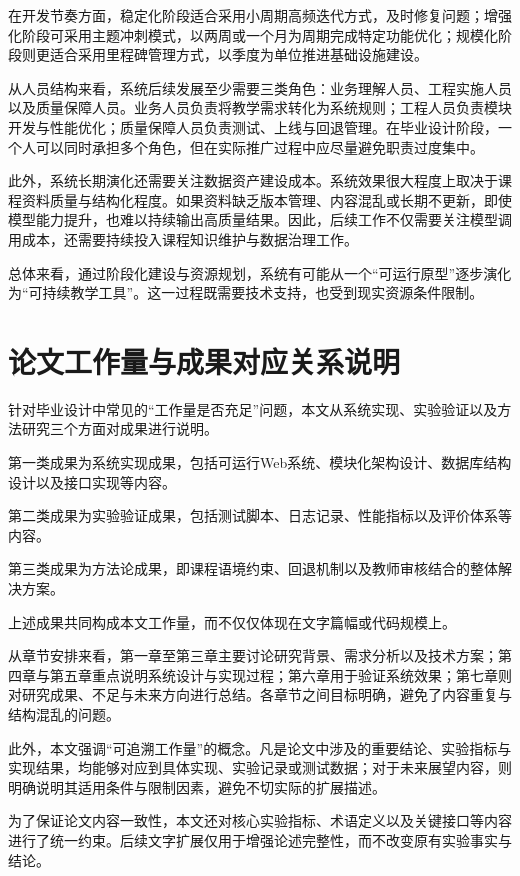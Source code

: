 \documentclass[12pt,a4paper,oneside]{ctexbook}
\numberwithin{equation}{chapter}
\begin{document}
在开发节奏方面，稳定化阶段适合采用小周期高频迭代方式，及时修复问题；增强化阶段可采用主题冲刺模式，以两周或一个月为周期完成特定功能优化；规模化阶段则更适合采用里程碑管理方式，以季度为单位推进基础设施建设。

从人员结构来看，系统后续发展至少需要三类角色：业务理解人员、工程实施人员以及质量保障人员。业务人员负责将教学需求转化为系统规则；工程人员负责模块开发与性能优化；质量保障人员负责测试、上线与回退管理。在毕业设计阶段，一个人可以同时承担多个角色，但在实际推广过程中应尽量避免职责过度集中。

此外，系统长期演化还需要关注数据资产建设成本。系统效果很大程度上取决于课程资料质量与结构化程度。如果资料缺乏版本管理、内容混乱或长期不更新，即使模型能力提升，也难以持续输出高质量结果。因此，后续工作不仅需要关注模型调用成本，还需要持续投入课程知识维护与数据治理工作。

总体来看，通过阶段化建设与资源规划，系统有可能从一个“可运行原型”逐步演化为“可持续教学工具”。这一过程既需要技术支持，也受到现实资源条件限制。

\section{论文工作量与成果对应关系说明}

针对毕业设计中常见的“工作量是否充足”问题，本文从系统实现、实验验证以及方法研究三个方面对成果进行说明。

第一类成果为系统实现成果，包括可运行Web系统、模块化架构设计、数据库结构设计以及接口实现等内容。

第二类成果为实验验证成果，包括测试脚本、日志记录、性能指标以及评价体系等内容。

第三类成果为方法论成果，即课程语境约束、回退机制以及教师审核结合的整体解决方案。

上述成果共同构成本文工作量，而不仅仅体现在文字篇幅或代码规模上。

从章节安排来看，第一章至第三章主要讨论研究背景、需求分析以及技术方案；第四章与第五章重点说明系统设计与实现过程；第六章用于验证系统效果；第七章则对研究成果、不足与未来方向进行总结。各章节之间目标明确，避免了内容重复与结构混乱的问题。

此外，本文强调“可追溯工作量”的概念。凡是论文中涉及的重要结论、实验指标与实现结果，均能够对应到具体实现、实验记录或测试数据；对于未来展望内容，则明确说明其适用条件与限制因素，避免不切实际的扩展描述。

为了保证论文内容一致性，本文还对核心实验指标、术语定义以及关键接口等内容进行了统一约束。后续文字扩展仅用于增强论述完整性，而不改变原有实验事实与结论。
\end{document}
